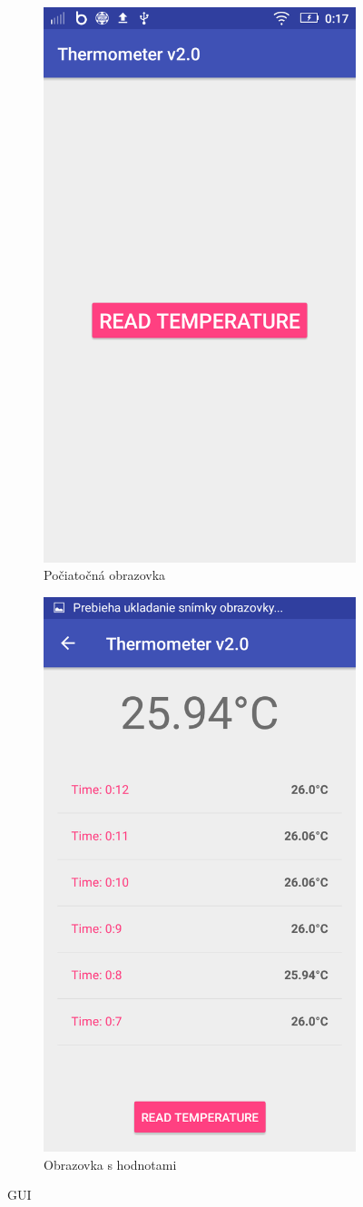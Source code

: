 \documentclass[a4paper, 11pt]{article}
\begin{document}
\begin{figure}[H]
\centering
\begin{subfigure}{.5\textwidth}
  \centering
  \includegraphics[width=.5\linewidth]{img/app1.png}
  \caption{Počiatočná obrazovka}
  \label{fig:sub1}
\end{subfigure}%
\begin{subfigure}{.5\textwidth}
  \centering
  \includegraphics[width=.5\linewidth]{img/app2.png}
  \caption{Obrazovka s hodnotami}
  \label{fig:sub2}
\end{subfigure}
\caption{GUI}
\label{fig:test}
\end{figure}
\end{document}
